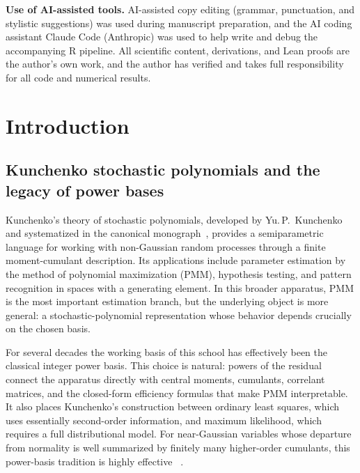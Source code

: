 \documentclass[11pt]{article}
\theoremstyle{definition}
\begin{document}
\medskip
\noindent\textbf{Use of AI-assisted tools.} AI-assisted copy editing
(grammar, punctuation, and stylistic suggestions) was used during
manuscript preparation, and the AI coding assistant Claude Code
(Anthropic) was used to help write and debug the accompanying R
pipeline. All scientific content, derivations, and Lean proofs are the
author's own work, and the author has verified and takes full
responsibility for all code and numerical results.

\section{Introduction}\label{sec:intro}

\subsection{Kunchenko stochastic polynomials and the legacy of power bases}\label{sec:intro:kunchenko}

Kunchenko's theory of stochastic polynomials, developed by Yu.\,P.~Kunchenko
and systematized in the canonical monograph~\citep{kunchenko2002}, provides a
semiparametric language for working with non-Gaussian random processes through
a finite moment-cumulant description. Its applications include parameter
estimation by the method of polynomial maximization (PMM), hypothesis testing,
and pattern recognition in spaces with a generating element. In this broader
apparatus, PMM is the most important estimation branch, but the underlying
object is more general: a stochastic-polynomial representation whose behavior
depends crucially on the chosen basis.

For several decades the working basis of this school has effectively been the
classical integer power basis. This choice is natural: powers of the residual
connect the apparatus directly with central moments, cumulants, correlant
matrices, and the closed-form efficiency formulas that make PMM interpretable.
It also places Kunchenko's construction between ordinary least squares, which
uses essentially second-order information, and maximum likelihood, which
requires a full distributional model. For near-Gaussian variables whose
departure from normality is well summarized by finitely many higher-order
cumulants, this power-basis tradition is highly effective
~\citep{kunchenko2002,kunchenko2006stochastic}.
\end{document}
